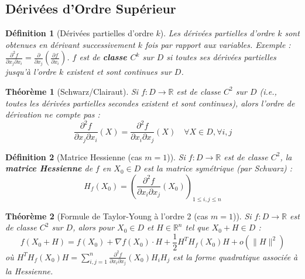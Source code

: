 \documentclass[a4paper]{article}
\newcommand{\R}{\mathbb{R}}
\newtheorem{theorem}{Théorème}[section]
\newtheorem{definition}{Définition}[section]
\begin{document}
\subsection{Dérivées d'Ordre Supérieur}
\begin{definition}[Dérivées partielles d'ordre \(k\)]
    Les dérivées partielles d'ordre \(k\) sont obtenues en dérivant successivement \(k\) fois par rapport aux variables.
    Exemple : \(\frac{\partial^2 f}{\partial x_j \partial x_i} = \frac{\partial}{\partial x_j} \left(\frac{\partial f}{\partial x_i}\right)\).
    \(f\) est de \textbf{classe \(C^k\)} sur \(D\) si toutes ses dérivées partielles jusqu'à l'ordre \(k\) existent et sont continues sur \(D\).
\end{definition}
\begin{theorem}[Schwarz/Clairaut]
    Si \(f:D \to \R\) est de classe \(C^2\) sur \(D\) (i.e., toutes les dérivées partielles secondes existent et sont continues), alors l'ordre de dérivation ne compte pas :
    \[ \frac{\partial^2 f}{\partial x_j \partial x_i}(X) = \frac{\partial^2 f}{\partial x_i \partial x_j}(X) \quad \forall X \in D, \forall i,j \]
\end{theorem}
\begin{definition}[Matrice Hessienne (cas \(m=1\))]
    Si \(f: D \to \R\) est de classe \(C^2\), la \textbf{matrice Hessienne} de \(f\) en \(X_0 \in D\) est la matrice symétrique (par Schwarz) :
    \[ H_f(X_0) = \left( \frac{\partial^2 f}{\partial x_i \partial x_j}(X_0) \right)_{1 \le i,j \le n} \]
\end{definition}
\begin{theorem}[Formule de Taylor-Young à l'ordre 2 (cas \(m=1\))]
    Si \(f:D \to \R\) est de classe \(C^2\) sur \(D\), alors pour \(X_0 \in D\) et \(H \in \R^n\) tel que \(X_0+H \in D\) :
    \[ f(X_0+H) = f(X_0) + \nabla f(X_0) \cdot H + \frac{1}{2} H^T H_f(X_0) H + o(\|H\|^2) \]
    où \(H^T H_f(X_0) H = \sum_{i,j=1}^n \frac{\partial^2 f}{\partial x_i \partial x_j}(X_0) H_i H_j\) est la forme quadratique associée à la Hessienne.
\end{theorem}
\end{document}
